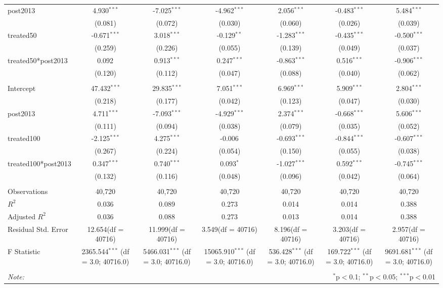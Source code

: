 \documentclass[12pt]{article}
\begin{document}
\begin{table}[!htbp]
\begin{tabular}{@{\extracolsep{5pt}}lcccccc}
 post2013 & 4.930$^{***}$ & -7.025$^{***}$ & -4.962$^{***}$ & 2.056$^{***}$ & -0.483$^{***}$ & 5.484$^{***}$ \\
  & (0.081) & (0.072) & (0.030) & (0.060) & (0.026) & (0.039) \\
 treated50 & -0.671$^{***}$ & 3.018$^{***}$ & -0.129$^{**}$ & -1.283$^{***}$ & -0.435$^{***}$ & -0.500$^{***}$ \\
  & (0.259) & (0.226) & (0.055) & (0.139) & (0.049) & (0.037) \\
 treated50*post2013 & 0.092$^{}$ & 0.913$^{***}$ & 0.247$^{***}$ & -0.863$^{***}$ & 0.516$^{***}$ & -0.906$^{***}$ \\
  & (0.120) & (0.112) & (0.047) & (0.088) & (0.040) & (0.062) \\
\hline \\[-1.8ex]
 Intercept & 47.432$^{***}$ & 29.835$^{***}$ & 7.051$^{***}$ & 6.969$^{***}$ & 5.909$^{***}$ & 2.804$^{***}$ \\
  & (0.218) & (0.177) & (0.042) & (0.123) & (0.047) & (0.030) \\
 post2013 & 4.711$^{***}$ & -7.093$^{***}$ & -4.929$^{***}$ & 2.374$^{***}$ & -0.668$^{***}$ & 5.606$^{***}$ \\
  & (0.111) & (0.094) & (0.038) & (0.079) & (0.035) & (0.052) \\
 treated100 & -2.125$^{***}$ & 4.275$^{***}$ & -0.006$^{}$ & -0.693$^{***}$ & -0.844$^{***}$ & -0.607$^{***}$ \\
  & (0.267) & (0.224) & (0.054) & (0.150) & (0.055) & (0.038) \\
 treated100*post2013 & 0.347$^{***}$ & 0.740$^{***}$ & 0.093$^{*}$ & -1.027$^{***}$ & 0.592$^{***}$ & -0.745$^{***}$ \\
  & (0.132) & (0.116) & (0.048) & (0.096) & (0.042) & (0.064) \\
\hline \\[-1.8ex]
 Observations & 40,720 & 40,720 & 40,720 & 40,720 & 40,720 & 40,720 \\
 $R^2$ & 0.036 & 0.089 & 0.273 & 0.014 & 0.014 & 0.388 \\
 Adjusted $R^2$ & 0.036 & 0.088 & 0.273 & 0.013 & 0.014 & 0.388 \\
 Residual Std. Error & 12.654(df = 40716) & 11.999(df = 40716) & 3.549(df = 40716) & 8.196(df = 40716) & 3.203(df = 40716) & 2.957(df = 40716)  \\
 F Statistic & 2365.544$^{***}$ (df = 3.0; 40716.0) & 5466.031$^{***}$ (df = 3.0; 40716.0) & 15065.910$^{***}$ (df = 3.0; 40716.0) & 536.428$^{***}$ (df = 3.0; 40716.0) & 169.722$^{***}$ (df = 3.0; 40716.0) & 9691.681$^{***}$ (df = 3.0; 40716.0) \\
\hline
\hline \\[-1.8ex]
\textit{Note:} & \multicolumn{6}{r}{$^{*}$p$<$0.1; $^{**}$p$<$0.05; $^{***}$p$<$0.01} \\
\end{tabular}
\end{table}
\end{document}

